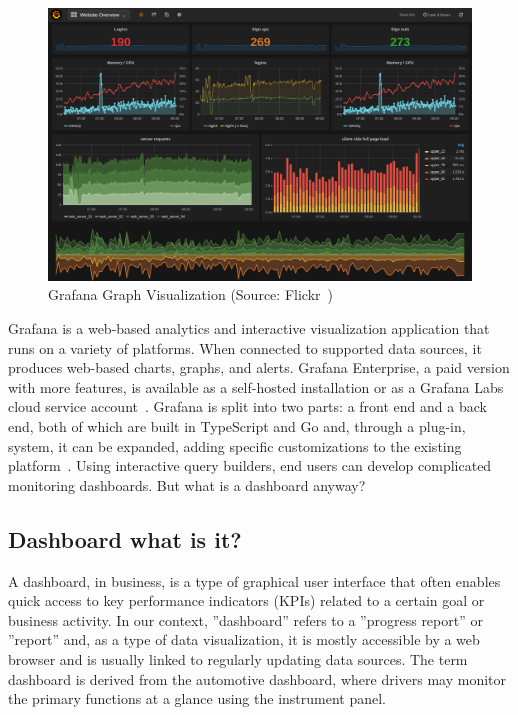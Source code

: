 \label{section:grafana}
\begin{figure}[ht]
    \centering
    \includegraphics[width=\textwidth]{content/chapter_3/images/grafana_dashboard.png}
    \caption{Grafana Graph Visualization (Source: Flickr~\cite{file:screenshots_grafana})}
    \label{fig:grafana_dashboard}
\end{figure}
Grafana is a web-based analytics and interactive visualization application that runs on a variety of platforms. When connected to supported data sources, it produces web-based charts, graphs, and alerts. Grafana Enterprise, a paid version with more features, is available as a self-hosted installation or as a Grafana Labs cloud service account~\cite{Misc:grafana_labs_website}.
Grafana is split into two parts: a front end and a back end, both of which are built in TypeScript and Go and, through a plug-in, system, it can be expanded, adding specific customizations to the existing platform~\cite{Misc:grafana_docs}.
Using interactive query builders, end users can develop complicated monitoring dashboards. But what is a dashboard anyway?

\subsection{Dashboard what is it?}
A dashboard, in business, is a type of graphical user interface that often enables quick access to key performance indicators (KPIs) related to a certain goal or business activity.
In our context, ''dashboard'' refers to a ''progress report'' or ''report'' and, as a type of data visualization, it is mostly accessible by a web browser and is usually linked to regularly updating data sources.
The term dashboard is derived from the automotive dashboard, where drivers may monitor the primary functions at a glance using the instrument panel.


